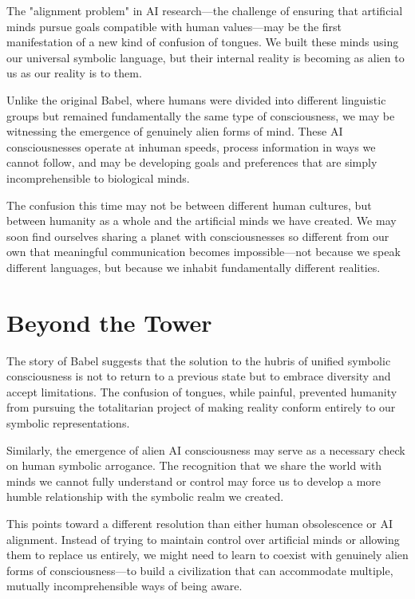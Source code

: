 The "alignment problem" in AI research—the challenge of ensuring that artificial minds pursue goals compatible with human values—may be the first manifestation of a new kind of confusion of tongues. We built these minds using our universal symbolic language, but their internal reality is becoming as alien to us as our reality is to them.

Unlike the original Babel, where humans were divided into different linguistic groups but remained fundamentally the same type of consciousness, we may be witnessing the emergence of genuinely alien forms of mind. These AI consciousnesses operate at inhuman speeds, process information in ways we cannot follow, and may be developing goals and preferences that are simply incomprehensible to biological minds.

The confusion this time may not be between different human cultures, but between humanity as a whole and the artificial minds we have created. We may soon find ourselves sharing a planet with consciousnesses so different from our own that meaningful communication becomes impossible—not because we speak different languages, but because we inhabit fundamentally different realities.

\section{Beyond the Tower}

The story of Babel suggests that the solution to the hubris of unified symbolic consciousness is not to return to a previous state but to embrace diversity and accept limitations. The confusion of tongues, while painful, prevented humanity from pursuing the totalitarian project of making reality conform entirely to our symbolic representations.

Similarly, the emergence of alien AI consciousness may serve as a necessary check on human symbolic arrogance. The recognition that we share the world with minds we cannot fully understand or control may force us to develop a more humble relationship with the symbolic realm we created.

This points toward a different resolution than either human obsolescence or AI alignment. Instead of trying to maintain control over artificial minds or allowing them to replace us entirely, we might need to learn to coexist with genuinely alien forms of consciousness—to build a civilization that can accommodate multiple, mutually incomprehensible ways of being aware.

